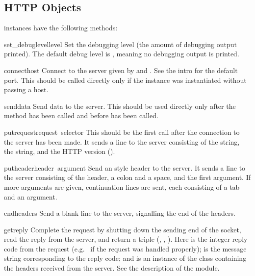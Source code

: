 \subsection{HTTP Objects}

 instances have the following methods:

\renewcommand{\indexsubitem}{(HTTP method)}

\begin{funcdesc}{set_debuglevel}{level}
Set the debugging level (the amount of debugging output printed).
The default debug level is , meaning no debugging output is
printed.
\end{funcdesc}

\begin{funcdesc}{connect}{host}
Connect to the server given by  and .  See the
intro for the default port.  This should be called directly only if
the instance was instantiated without passing a host.
\end{funcdesc}

\begin{funcdesc}{send}{data}
Send data to the server.  This should be used directly only after the
 method has been called and before
 has been called.
\end{funcdesc}

\begin{funcdesc}{putrequest}{request\, selector}
This should be the first call after the connection to the server has
been made.  It sends a line to the server consisting of the
 string, the  string, and the HTTP version
().
\end{funcdesc}

\begin{funcdesc}{putheader}{header\, argument}
Send an  style header to the server.  It sends a line to the
server consisting of the header, a colon and a space, and the first
argument.  If more arguments are given, continuation lines are sent,
each consisting of a tab and an argument.
\end{funcdesc}

\begin{funcdesc}{endheaders}{}
Send a blank line to the server, signalling the end of the headers.
\end{funcdesc}

\begin{funcdesc}{getreply}{}
Complete the request by shutting down the sending end of the socket,
read the reply from the server, and return a triple (,
, ).  Here  is the integer
reply code from the request (e.g.\  if the request was
handled properly);  is the message string corresponding
to the reply code; and  is an instance of the class
 containing the headers received from the server.
See the description of the  module.
\end{funcdesc}

